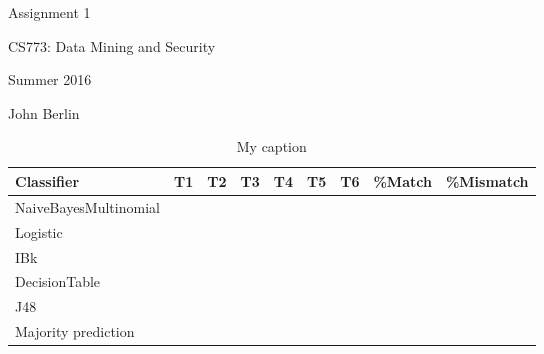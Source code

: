 \documentclass[letterpaper,10pt]{article}
\begin{document}
\begin{center}
\Huge{Assignment 1}

\Large{CS773: Data Mining and Security}

\Large{Summer 2016}

\Large{John Berlin}
\end{center}



\begin{table}[h]
\centering
\begin{tabular}{|l|l|l|l|l|l|l|l|l|}
\hline
Classifier            & T1 & T2 & T3 & T4 & T5 & T6 & \%Match & \%Mismatch \\ \hline
NaiveBayesMultinomial &    &    &    &    &    &    &         &            \\ \hline
Logistic              &    &    &    &    &    &    &         &            \\ \hline
IBk                   &    &    &    &    &    &    &         &            \\ \hline
DecisionTable         &    &    &    &    &    &    &         &            \\ \hline
J48                   &    &    &    &    &    &    &         &            \\ \hline
Majority prediction   &    &    &    &    &    &    &         &            \\ \hline
\end{tabular}
\caption{My caption}
\label{my-label}
\end{table}
\end{document}
